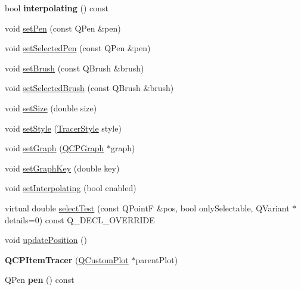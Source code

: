\begin{DoxyCompactItemize}
bool {\bfseries interpolating} () const
\item 
void \hyperlink{class_q_c_p_item_tracer_af8048636fc1ef0152e51809b008df2ca}{set\+Pen} (const Q\+Pen \&pen)
\item 
void \hyperlink{class_q_c_p_item_tracer_ae1bf70db7f13f928660168cd3e5069f3}{set\+Selected\+Pen} (const Q\+Pen \&pen)
\item 
void \hyperlink{class_q_c_p_item_tracer_a2c303f7470a30084daa201ed556b3c36}{set\+Brush} (const Q\+Brush \&brush)
\item 
void \hyperlink{class_q_c_p_item_tracer_a0f55c084980a7a312af859d3e7b558ef}{set\+Selected\+Brush} (const Q\+Brush \&brush)
\item 
void \hyperlink{class_q_c_p_item_tracer_ae47fe0617f5fef5fdb766999569be10a}{set\+Size} (double size)
\item 
void \hyperlink{class_q_c_p_item_tracer_a41a2ac4f1acd7897b4e2a2579c03204e}{set\+Style} (\hyperlink{class_q_c_p_item_tracer_a2f05ddb13978036f902ca3ab47076500}{Tracer\+Style} style)
\item 
void \hyperlink{class_q_c_p_item_tracer_af5886f4ded8dd68cb4f3388f390790c0}{set\+Graph} (\hyperlink{class_q_c_p_graph}{Q\+C\+P\+Graph} $\ast$graph)
\item 
void \hyperlink{class_q_c_p_item_tracer_a6840143b42f3b685cedf7c6d83a704c8}{set\+Graph\+Key} (double key)
\item 
void \hyperlink{class_q_c_p_item_tracer_a6c244a9d1175bef12b50afafd4f5fcd2}{set\+Interpolating} (bool enabled)
\item 
virtual double \hyperlink{class_q_c_p_item_tracer_a9fd955fea40e977d66f3a9fd5765aec4}{select\+Test} (const Q\+PointF \&pos, bool only\+Selectable, Q\+Variant $\ast$details=0) const Q\+\_\+\+D\+E\+C\+L\+\_\+\+O\+V\+E\+R\+R\+I\+DE
\item 
void \hyperlink{class_q_c_p_item_tracer_a5b90296109e36384aedbc8908a670413}{update\+Position} ()
\item 
\mbox{\label{class_q_c_p_item_tracer_adc5ca846eeac323db4aa1fc4081e36be}} 
{\bfseries Q\+C\+P\+Item\+Tracer} (\hyperlink{class_q_custom_plot}{Q\+Custom\+Plot} $\ast$parent\+Plot)
\item 
\mbox{\label{class_q_c_p_item_tracer_a789cdc627868f5a4a0956816072571c9}} 
Q\+Pen {\bfseries pen} () const
\item 
\mbox{\label{class_q_c_p_item_tracer_ad231a97bac99e01778618d1a5720b17d}} 

\end{DoxyCompactItemize}
